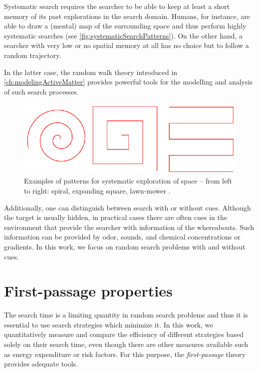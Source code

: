 Systematic search requires the searcher to be able to keep at least a short memory of its past explorations in the search domain. Humans, for instance, are able to draw a (mental) map of the surrounding space and thus perform highly systematic searches (see \autoref{fig:systematicSearchPatterns}). On the other hand, a searcher with very low or no spatial memory at all has no choice but to follow a random trajectory.

In the latter case, the random walk theory introduced in \autoref{ch:modelingActiveMatter} provides powerful tools for the modelling and analysis of such search processes.

\begin{figure}[bth]
 \myfloatalign
 \includegraphics[width=0.8\linewidth]{gfx/systematicSearchPatterns}
 \caption[Patterns of systematic search]{Examples of patterns for systematic exploration of space -- from left to right: spiral, expanding square, lawn-mower \cite{benichou:2011}.}\label{fig:systematicSearchPatterns}
\end{figure}

Additionally, one can distinguish between search with or without cues. Although the target is usually hidden, in practical cases there are often cues in the environment that provide the searcher with information of the whereabouts. Such information can be provided by \eg odor, sounds, and chemical concentrations or gradients. In this work, we focus on random search problems with and without cues.

\section{First-passage properties}
The search time is a limiting quantity in random search problems and thus it is essential to use search strategies which minimize it. In this work, we quantitatively measure and compare the efficiency of different strategies based solely on their search time, even though there are other measures available such as \eg energy expenditure or risk factors.  For this purpose, the \textit{first-passage} theory provides adequate tools.

